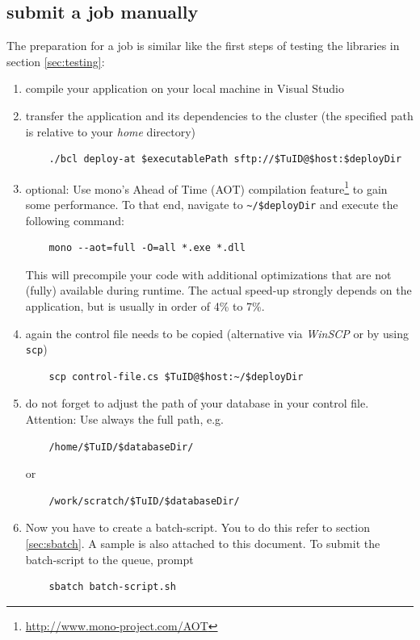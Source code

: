 \documentclass[11pt,twoside,a4paper]{fdyartcl}
\begin{document}
\subsection{submit a job manually}
The preparation for a job is similar like the first steps of testing the libraries in section \ref{sec:testing}:
\begin{enumerate}
	\item compile your application on your local machine in Visual Studio
	\item transfer the application and its dependencies to the cluster (the specified path is relative to your \emph{home} directory)
	\begin{verbatim}
	./bcl deploy-at $executablePath sftp://$TuID@$host:$deployDir
	\end{verbatim}
	\item optional: Use mono's Ahead of Time (AOT) compilation feature\footnote{\url{http://www.mono-project.com/AOT}} to gain some performance. To that end, navigate to \verb|~/$deployDir| and execute the following command:
	\begin{verbatim}
	mono --aot=full -O=all *.exe *.dll
	\end{verbatim}
	This will precompile your code with additional optimizations that are not (fully) available during runtime. The actual speed-up strongly depends on the application, but is usually in order of 4\% to 7\%.
	\item again the control file needs to be copied (alternative via \emph{WinSCP} or by using \verb|scp|)
	\begin{verbatim}
	scp control-file.cs $TuID@$host:~/$deployDir
	\end{verbatim}
	\item do not forget to adjust the path of your database in your control file. Attention: Use always the full path, e.g.
	\begin{verbatim}
	/home/$TuID/$databaseDir/
	\end{verbatim}
	or
	\begin{verbatim}
	/work/scratch/$TuID/$databaseDir/
	\end{verbatim}
	\item Now you have to create a batch-script. You to do this refer to section \ref{sec:sbatch}. A sample is also attached to this document.
	To submit the batch-script to the queue, prompt
	\begin{verbatim}
	sbatch batch-script.sh
	\end{verbatim}
\end{enumerate}
\end{document}
